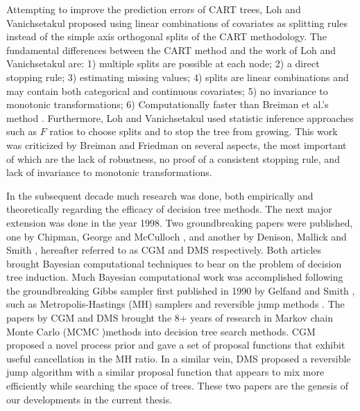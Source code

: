 Attempting to improve the prediction errors of CART trees, Loh and Vanichsetakul proposed using linear combinations of covariates as splitting rules instead of the simple axis orthogonal splits of the CART methodology. The fundamental differences between the CART method and the work of Loh and Vanichsetakul are: 1) multiple splits are possible at each node; 2) a direct stopping rule; 3) estimating missing values; 4) splits are linear combinations and may contain both categorical and continuous covariates;  5) no invariance to monotonic transformations; 6) Computationally faster than Breiman et al.'s method \cite{loh1988tree}. Furthermore, Loh and Vanichsetakul used statistic inference approaches such as $F$ ratios to choose splits and to stop the tree from growing. This work was criticized by Breiman and Friedman  \cite{breiman1988comment} on several aspects, the most important of which are the lack of robustness, no proof of a consistent stopping rule, and lack of invariance to monotonic transformations. 

In the subsequent decade much research was done, both empirically and theoretically regarding the efficacy of decision tree methods. The next major extension was done in the year 1998. Two groundbreaking papers were published, one by Chipman, George and McCulloch \cite{chipman1998bayesian}, and another by Denison, Mallick and Smith \cite{denison1998bayesian}, hereafter referred to as CGM and DMS  respectively. Both articles brought Bayesian computational techniques to bear on the problem of decision tree induction. Much Bayesian computational work was accomplished following the groundbreaking Gibbs sampler first published in 1990 by Gelfand and Smith \cite{gelfand1990sampling}, such as Metropolis-Hastings (MH) samplers \cite{hastings1970monte,robert1999monte} and reversible jump methods \cite{green1995reversible}. The papers by CGM and DMS brought the 8+ years of research in Markov chain Monte Carlo (MCMC )methods into decision tree search methods. CGM proposed a novel process prior and gave a set of proposal functions that exhibit useful cancellation in the MH ratio. In a similar vein, DMS proposed a reversible jump algorithm with a similar proposal function that appears to mix more efficiently while searching the space of trees. These two papers are the genesis of our developments in the current thesis. 

